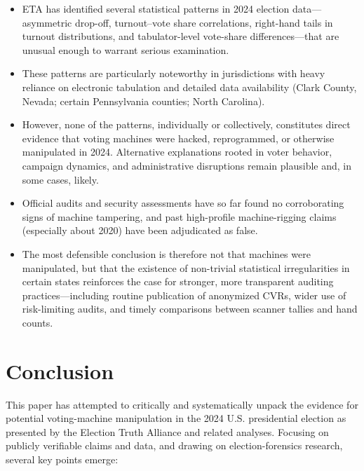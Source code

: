 \documentclass[12pt]{article}
\begin{document}
\begin{itemize}
    \item ETA has identified several statistical patterns in 2024 election data---asymmetric drop-off, turnout--vote share correlations, right-hand tails in turnout distributions, and tabulator-level vote-share differences---that are unusual enough to warrant serious examination.

    \item These patterns are particularly noteworthy in jurisdictions with heavy reliance on electronic tabulation and detailed data availability (Clark County, Nevada; certain Pennsylvania counties; North Carolina).

    \item However, none of the patterns, individually or collectively, constitutes direct evidence that voting machines were hacked, reprogrammed, or otherwise manipulated in 2024. Alternative explanations rooted in voter behavior, campaign dynamics, and administrative disruptions remain plausible and, in some cases, likely.

    \item Official audits and security assessments have so far found no corroborating signs of machine tampering, and past high-profile machine-rigging claims (especially about 2020) have been adjudicated as false.

    \item The most defensible conclusion is therefore not that machines were manipulated, but that the existence of non-trivial statistical irregularities in certain states reinforces the case for stronger, more transparent auditing practices---including routine publication of anonymized CVRs, wider use of risk-limiting audits, and timely comparisons between scanner tallies and hand counts.
\end{itemize}

\section{Conclusion}

This paper has attempted to critically and systematically unpack the evidence for potential voting-machine manipulation in the 2024 U.S. presidential election as presented by the Election Truth Alliance and related analyses. Focusing on publicly verifiable claims and data, and drawing on election-forensics research, several key points emerge:
\end{document}
